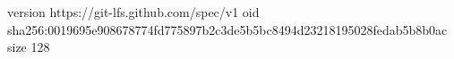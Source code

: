 version https://git-lfs.github.com/spec/v1
oid sha256:0019695e908678774fd775897b2c3de5b5bc8494d23218195028fedab5b8b0ac
size 128
